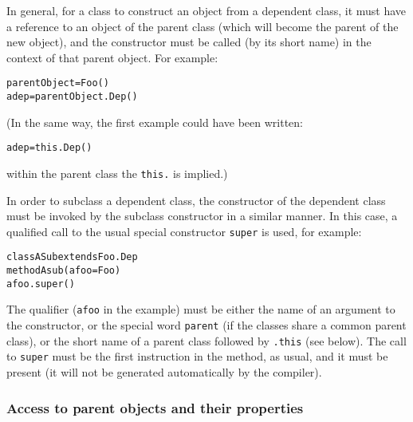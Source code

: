 In general, for a class to construct an object from a dependent class,
it must have a reference to an object of the parent class (which will
become the parent of the new object), and the constructor must be called
(by its short name) in the context of that parent object.  For example:
\begin{alltt}
parentObject=Foo()
adep=parentObject.Dep()
\end{alltt}
(In the same way, the first example could have been written:
\begin{alltt}
adep=this.Dep()
\end{alltt}
within the parent class the \texttt{this.} is implied.)
 
In order to subclass a dependent class, the constructor of the dependent
class must be invoked by the subclass constructor in a similar manner.
In this case, a qualified call to the usual special
constructor \texttt{super} is used, for example:
\begin{alltt}
class ASub extends Foo.Dep
  method Asub(afoo=Foo)
    afoo.super()
\end{alltt}
 The qualifier (\texttt{afoo} in the example) must be either the name of
an argument to the constructor, or the special word \texttt{parent} (if
the classes share a common parent class), or the short name of a parent
class followed by \texttt{.this} (see below).
The call to \texttt{super} must be the first instruction in the method, as
usual, and it must be present (it will not be generated automatically by
the compiler).
\subsubsection{Access to parent objects and their properties}
 
